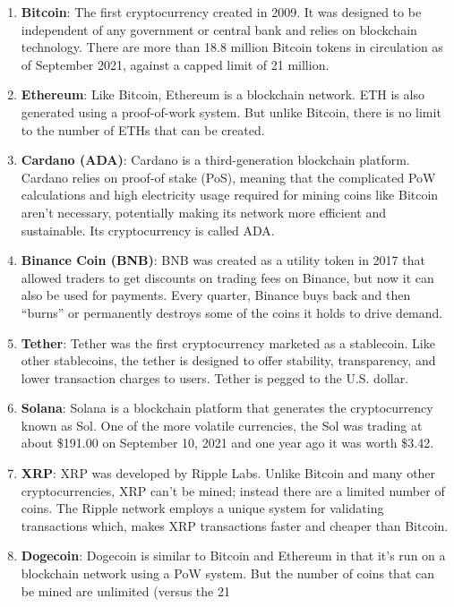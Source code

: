 \documentclass[11pt]{article}
\begin{document}
\begin{enumerate}
    \item \textbf{Bitcoin}: The first cryptocurrency created in 2009. It was designed to be independent 
    of any government or central bank and relies on blockchain technology. There are more than 
    18.8 million Bitcoin tokens in circulation as of September 2021, against a capped limit of 21 
    million.
    \item \textbf{Ethereum}: Like Bitcoin, Ethereum is a blockchain network. ETH is also generated using a 
    proof-of-work system. But unlike Bitcoin, there is no limit to the number of ETHs that can be 
    created.
    \item \textbf{Cardano (ADA)}: Cardano is a third-generation blockchain platform. Cardano relies on proof-of
    stake (PoS), meaning that the complicated PoW calculations and high electricity usage required 
    for mining coins like Bitcoin aren’t necessary, potentially making its network more efficient and 
    sustainable. Its cryptocurrency is called ADA.  
    \item \textbf{Binance Coin (BNB)}:  BNB was created as a utility token in 2017 that allowed traders to get 
    discounts on trading fees on Binance, but now it can also be used for payments. Every quarter, 
    Binance buys back and then “burns” or permanently destroys some of the coins it holds to drive 
    demand.
    \item \textbf{Tether}: Tether was the first cryptocurrency marketed as a stablecoin. Like other stablecoins, the 
    tether is designed to offer stability, transparency, and lower transaction charges to users. Tether 
    is pegged to the U.S. dollar. 
    \item \textbf{Solana}: Solana is a blockchain platform that generates the cryptocurrency known as Sol. One of 
    the more volatile currencies, the Sol was trading at about \$191.00 on September 10, 2021 and 
    one year ago it was worth \$3.42. 
    \item \textbf{XRP}: XRP was developed by Ripple Labs. Unlike Bitcoin and many other cryptocurrencies, 
    XRP can’t be mined; instead there are a limited number of coins. The Ripple network employs a 
    unique system for validating transactions which, makes XRP transactions faster and cheaper than 
    Bitcoin.
    \item \textbf{Dogecoin}:  Dogecoin is similar to Bitcoin and Ethereum in that it’s run on a blockchain network 
    using a PoW system. But the number of coins that can be mined are unlimited (versus the 21 

\end{enumerate}
\end{document}

